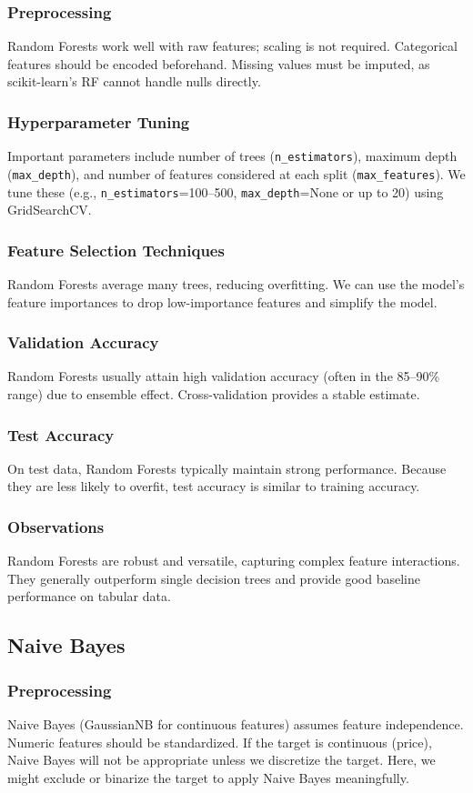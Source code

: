 \documentclass[12pt]{article}
\begin{document}
\subsubsection{Preprocessing}
Random Forests work well with raw features; scaling is not required. Categorical features should be encoded beforehand. Missing values must be imputed, as scikit-learn's RF cannot handle nulls directly.
\subsubsection{Hyperparameter Tuning}
Important parameters include number of trees (\texttt{n\_estimators}), maximum depth (\texttt{max\_depth}), and number of features considered at each split (\texttt{max\_features}). We tune these (e.g., \texttt{n\_estimators}=100--500, \texttt{max\_depth}=None or up to 20) using GridSearchCV.
\subsubsection{Feature Selection Techniques}
Random Forests average many trees, reducing overfitting. We can use the model's feature importances to drop low-importance features and simplify the model.
\subsubsection{Validation Accuracy}
Random Forests usually attain high validation accuracy (often in the 85--90\% range) due to ensemble effect. Cross-validation provides a stable estimate.
\subsubsection{Test Accuracy}
On test data, Random Forests typically maintain strong performance. Because they are less likely to overfit, test accuracy is similar to training accuracy.
\subsubsection{Observations}
Random Forests are robust and versatile, capturing complex feature interactions. They generally outperform single decision trees and provide good baseline performance on tabular data.

\subsection{Naive Bayes}
\subsubsection{Preprocessing}
Naive Bayes (GaussianNB for continuous features) assumes feature independence. Numeric features should be standardized. If the target is continuous (price), Naive Bayes will not be appropriate unless we discretize the target. Here, we might exclude or binarize the target to apply Naive Bayes meaningfully.
\end{document}
